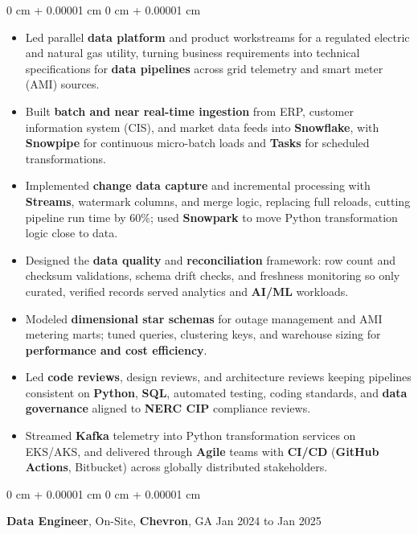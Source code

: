 \documentclass[10pt, letterpaper]{article}
\newenvironment{highlights}{
    \begin{itemize}[
        topsep=0.04 cm,
        parsep=0.04 cm,
        partopsep=0pt,
        itemsep=0pt,
        leftmargin=0 cm + 10pt
    ]
}{
    \end{itemize}
} %
\newenvironment{onecolentry}{
    \begin{adjustwidth}{
        0 cm + 0.00001 cm
    }{
        0 cm + 0.00001 cm
    }
}{
    \end{adjustwidth}
} %
\newcommand{\resumeheading}[2]{%
    \begin{onecolentry}
        #1 \hfill #2
    \end{onecolentry}
} %
\begin{document}
\begin{onecolentry}
\begin{highlights}
	\item Led parallel \textbf{data platform} and product workstreams for a regulated electric and natural gas utility, turning business requirements into technical specifications for \textbf{data pipelines} across grid telemetry and smart meter (AMI) sources.
	\item Built \textbf{batch and near real-time ingestion} from ERP, customer information system (CIS), and market data feeds into \textbf{Snowflake}, with \textbf{Snowpipe} for continuous micro-batch loads and \textbf{Tasks} for scheduled transformations.
	\item Implemented \textbf{change data capture} and incremental processing with \textbf{Streams}, watermark columns, and merge logic, replacing full reloads, cutting pipeline run time by 60\%; used \textbf{Snowpark} to move Python transformation logic close to data.
	\item Designed the \textbf{data quality} and \textbf{reconciliation} framework: row count and checksum validations, schema drift checks, and freshness monitoring so only curated, verified records served analytics and \textbf{AI/ML} workloads.
	\item Modeled \textbf{dimensional star schemas} for outage management and AMI metering marts; tuned queries, clustering keys, and warehouse sizing for \textbf{performance and cost efficiency}.
	\item Led \textbf{code reviews}, design reviews, and architecture reviews keeping pipelines consistent on \textbf{Python}, \textbf{SQL}, automated testing, coding standards, and \textbf{data governance} aligned to \textbf{NERC CIP} compliance reviews.
	\item Streamed \textbf{Kafka} telemetry into Python transformation services on EKS/AKS, and delivered through \textbf{Agile} teams with \textbf{CI/CD} (\textbf{GitHub Actions}, Bitbucket) across globally distributed stakeholders.
\end{highlights}
\end{onecolentry}


\vspace{0.15 cm}
\resumeheading{\textbf{Data Engineer}, On-Site, \textbf{Chevron}, GA}{Jan 2024 to Jan 2025}
\end{document}
